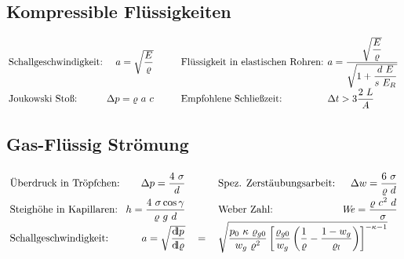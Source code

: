 \subsection{Kompressible Flüssigkeiten}
	\setlength{\abovedisplayshortskip}{-30pt}
	\[\arraycolsep=0.2em \def\arraystretch{1.7}
	\begin{array}{lrlll}
		\text{Schallgeschwindigkeit:} & a = \sqrt{\dfrac{E}{\varrho}} & \text{\qquad} & \text{Flüssigkeit in elastischen Rohren:} & a = \dfrac{\sqrt{\dfrac{E}{\varrho}}} {\sqrt{1+ \dfrac{d\ E}{s\ E_R}}} \\
		\text{Joukowski Stoß:}        & \Delta p = \varrho\ a\ c      & \text{\qquad} & \text{Empfohlene Schließzeit:}            & \Delta t > 3 \dfrac{2\ L}{A}
	\end{array} \]

\subsection{Gas-Flüssig Strömung}
	\setlength{\abovedisplayshortskip}{-20pt}
	\[\arraycolsep=0.3em \def\arraystretch{2}
	\begin{array}{lrclr}
		\text{Überdruck in Tröpfchen:}  & \Delta p = \dfrac{4\ \sigma}{d}                 & \text{\qquad} & \text{Spez. Zerstäubungsarbeit:} & \Delta w = \dfrac{6\ \sigma}{\varrho\ d} \\
		\text{Steighöhe in Kapillaren:} & h =  \dfrac{4\ \sigma\cos\gamma}{\varrho\ g\ d} & \text{\qquad} & \text{Weber Zahl:}               & \Webe = \dfrac{\varrho\ c^2\ d}{\sigma}  \\
		\text{Schallgeschwindigkeit:}   & a = \sqrt{\dfrac{\dd p}{\dd \varrho}}           & = &\multicolumn{2}{l}{ \sqrt{\dfrac{p_0\ \kappa\ \varrho_{g0}}{w_g\ \varrho^2}   \left[\dfrac{\varrho_{g0}}{w_g}  \left(\dfrac{1}{\varrho} - \dfrac{1-w_g}{\varrho_l}\right)\right] ^ {-\kappa-1}} }
	\end{array} \]
